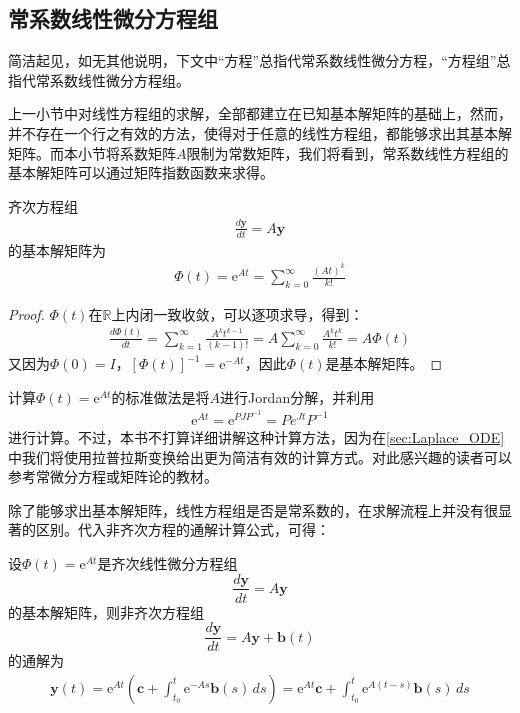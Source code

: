 \documentclass{ctexbook}
\begin{document}
\subsection{常系数线性微分方程组}\label{sub:constant_coefficient_linear_equation_system}

简洁起见，如无其他说明，下文中“方程”总指代常系数线性微分方程，“方程组”总指代常系数线性微分方程组。

上一小节中对线性方程组的求解，全部都建立在已知基本解矩阵的基础上，然而，并不存在一个行之有效的方法，使得对于任意的线性方程组，都能够求出其基本解矩阵。而本小节将系数矩阵$A$限制为常数矩阵，我们将看到，常系数线性方程组的基本解矩阵可以通过矩阵指数函数来求得。

\begin{theorem}
    齐次方程组\begin{align*}
    \frac{d\mathbf{y}}{dt}=A\mathbf{y}
    \end{align*}
    的基本解矩阵为\begin{align*}
    \Phi(t)=\mathrm{e}^{At}=\sum_{k=0}^{\infty}\frac{(At)^k}{k!}
    \end{align*}
\end{theorem}
\begin{proof}
    $\Phi(t)$在$\mathbb{R}$上内闭一致收敛，可以逐项求导，得到：
    \begin{align*}
    \frac{d\Phi(t)}{dt}=\sum_{k=1}^{\infty}\frac{A^k t^{k-1}}{(k-1)!}=A\sum_{k=0}^{\infty}\frac{A^k t^k}{k!}=A\Phi(t)
    \end{align*}
    又因为$\Phi(0)=I$，$[\Phi(t)]^{-1}=\mathrm{e}^{-At}$，因此$\Phi(t)$是基本解矩阵。
\end{proof}

计算$\Phi(t)=\mathrm{e}^{At}$的标准做法是将$A$进行Jordan分解，并利用\begin{align*}
    \mathrm{e}^{At}=\mathrm{e}^{PJP^{-1}}=Pe^{Jt}P^{-1}
\end{align*}
进行计算。不过，本书不打算详细讲解这种计算方法，因为在\ref{sec:Laplace_ODE}中我们将使用拉普拉斯变换给出更为简洁有效的计算方式。对此感兴趣的读者可以参考常微分方程\cite{ode}或矩阵论的教材。

除了能够求出基本解矩阵，线性方程组是否是常系数的，在求解流程上并没有很显著的区别。代入非齐次方程的通解计算公式，可得：
\begin{theorem}
    设$\Phi(t)=\mathrm{e}^{At}$是齐次线性微分方程组
    $$\frac{d\mathbf{y}}{dt}=A\mathbf{y}$$
    的基本解矩阵，则非齐次方程组
    $$\frac{d\mathbf{y}}{dt}=A\mathbf{y}+\mathbf{b}(t)$$
    的通解为\begin{align*}
    \mathbf{y}(t)=\mathrm{e}^{At}\left(\mathbf{c}+\int_{t_0}^t \mathrm{e}^{-As}\mathbf{b}(s)\,ds\right)=\mathrm{e}^{At}\mathbf{c}+\int_{t_0}^t \mathrm{e}^{A(t-s)}\mathbf{b}(s)\,ds
    \end{align*}
\end{theorem}
\end{document}
